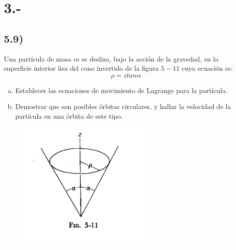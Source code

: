 \documentclass{article}
\begin{document}
\section*{3.-}
\subsection*{5.9)}
Una partícula de masa $m$ se desliza, bajo la acción de la gravedad, en la superficie interior
lisa del cono invertido de la figura $5-11$ cuya ecuación es:
\[ \rho = ztan\alpha \]
\begin{enumerate}[a)]
    \item Establecer las ecuaciones de movimiento de Lagrange para la partícula.
    \item Demostrar que son posibles órbitas circulares, y hallar la velocidad de la 
    partícula en una órbita de este tipo.
\end{enumerate}
\begin{figure}[H]
    \centering
    \includegraphics[scale=1]{p3_cone.png}
\end{figure}
\end{document}
